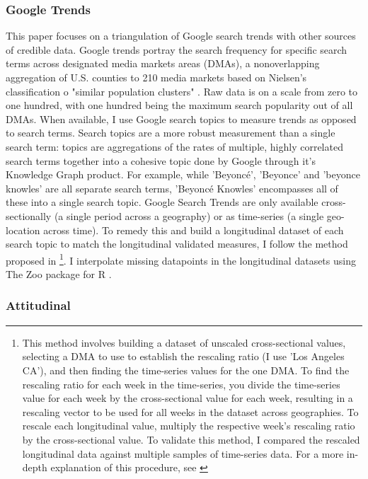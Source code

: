 \subsubsection{Google Trends}
This paper focuses on a triangulation of Google search trends \citep{googletrends}
with other sources of credible data.
Google trends portray the search frequency for specific search terms across
designated media markets areas (DMAs), a nonoverlapping aggregation of U.S.
counties to 210 media markets based on Nielsen's classification o "similar population clusters" \citep{dma_key}.
Raw data is on a scale from zero to one hundred, with one hundred being the maximum search
popularity out of all DMAs. When available, I use Google search topics to
measure trends as opposed to search terms. Search topics are a more robust
measurement than a single search term: topics are aggregations of the rates of
multiple, highly correlated search terms together into a cohesive topic done
by Google through it's Knowledge Graph product. For
example, while 'Beyoncé', 'Beyonce' and 'beyonce knowles' are all separate
search terms, 'Beyoncé Knowles' encompasses all of these into a single search
topic. Google Search Trends are only available cross-sectionally (a single 
period across a geography) or as time-series (a single geo-location across
time). To remedy this and build a longitudinal dataset of each search topic 
to match the longitudinal validated measures, I follow the method proposed 
in \citet[][p. 5]{park_etal}\footnote{This method involves building a dataset of unscaled cross-sectional values,
selecting a DMA to use to establish the rescaling ratio (I use 'Los Angeles
CA'), and then finding the time-series values for the one DMA. To find the
rescaling ratio for each week in the time-series, you divide the time-series
value for each week by the cross-sectional value for each week, resulting in a
rescaling vector to be used for all weeks in the dataset across geographies. To
rescale each longitudinal value, multiply the respective week's rescaling ratio
by the cross-sectional value. To validate this method, I compared the rescaled
longitudinal data against multiple samples of time-series data. For a more
in-depth explanation of this procedure, see \citet[p. 5]{park_etal}}. I interpolate 
missing datapoints in the longitudinal datasets using The Zoo package for R \citep{zoo}.

\subsubsection{Attitudinal}

